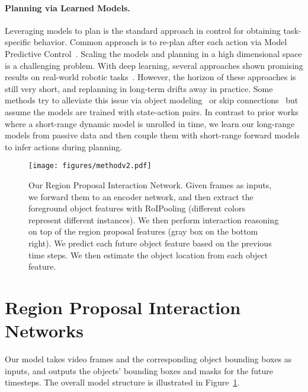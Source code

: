 \documentclass{article} \usepackage{iclr2021_conference,times}
\begin{document}
\paragraph{Planning via Learned Models.}
Leveraging models to plan is the standard approach in control for obtaining task-specific behavior. Common approach is to re-plan after each action via Model Predictive Control~\citep{allgower2012nonlinear,camacho2013model,deisenroth2011pilco}. Scaling the models and planning in a high dimensional space is a challenging problem. With deep learning, several approaches shown promising results on real-world robotic tasks~\citep{finn2016unsupervised,finn2017deep,agrawal2016learning,pathak2018zero}. However, the horizon of these approaches is still very short, and replanning in long-term drifts away in practice. Some methods try to alleviate this issue via object modeling~\citep{janner2018reasoning,li2019propagation} or skip connections~\citep{ebert2018robustness} but assume the models are trained with state-action pairs. In contrast to prior works where a short-range dynamic model is unrolled in time, we learn our long-range models from passive data and then couple them with short-range forward models to infer actions during planning.

\begin{figure}[t]
{
\centering
\texttt{[image: figures/methodv2.pdf]}
\caption{Our Region Proposal Interaction Network. Given  frames as inputs, we forward them to an encoder network, and then extract the foreground object features with RoIPooling (different colors represent different instances). We then perform interaction reasoning on top of the region proposal features (gray box on the bottom right). We predict each future object feature based on the previous  time steps. We then estimate the object location from each object feature.}
\label{fig:method}
}
\vspace{-1.25em}
\end{figure}

\vspace{-0.75em}
\section{Region Proposal Interaction Networks}
\vspace{-0.75em}
Our model takes  video frames and the corresponding object bounding boxes as inputs, and outputs the objects' bounding boxes and masks for the future  timesteps. The overall model structure is illustrated in Figure~\ref{fig:method}.
\end{document}
